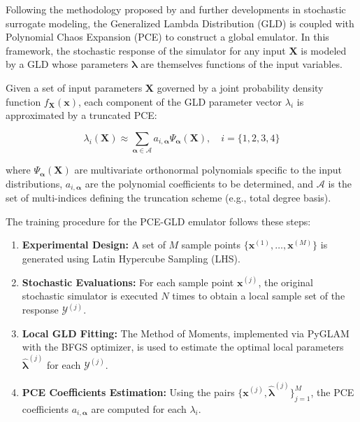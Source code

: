 Following the methodology proposed by \citet{ZhuSudret2020-GLAMoriginal} and further developments in stochastic surrogate modeling, the Generalized Lambda Distribution (GLD) is coupled with Polynomial Chaos Expansion (PCE) to construct a global emulator. In this framework, the stochastic response of the simulator for any input $\mathbf{X}$ is modeled by a GLD whose parameters $\boldsymbol{\lambda}$ are themselves functions of the input variables.

Given a set of input parameters $\mathbf{X}$ governed by a joint probability density function $f_{\mathbf{X}}(\mathbf{x})$, each component of the GLD parameter vector $\lambda_i$ is approximated by a truncated PCE:

\begin{equation}
\lambda_i(\mathbf{X}) \approx \sum_{\boldsymbol{\alpha} \in \mathcal{A}} a_{i, \boldsymbol{\alpha}} \Psi_{\boldsymbol{\alpha}}(\mathbf{X}), \quad i = \{1, 2, 3, 4\}
\label{eq:pce_lambda}
\end{equation}

where $\Psi_{\boldsymbol{\alpha}}(\mathbf{X})$ are multivariate orthonormal polynomials specific to the input distributions, $a_{i, \boldsymbol{\alpha}}$ are the polynomial coefficients to be determined, and $\mathcal{A}$ is the set of multi-indices defining the truncation scheme (e.g., total degree basis).

The training procedure for the PCE-GLD emulator follows these steps:

\begin{enumerate}
    \item \textbf{Experimental Design:} A set of $M$ sample points $\{\mathbf{x}^{(1)}, \dots, \mathbf{x}^{(M)}\}$ is generated using Latin Hypercube Sampling (LHS).
    \item \textbf{Stochastic Evaluations:} For each sample point $\mathbf{x}^{(j)}$, the original stochastic simulator is executed $N$ times to obtain a local sample set of the response $\mathcal{Y}^{(j)}$.
    \item \textbf{Local GLD Fitting:} The Method of Moments, implemented via PyGLAM with the BFGS optimizer, is used to estimate the optimal local parameters $\hat{\boldsymbol{\lambda}}^{(j)}$ for each $\mathcal{Y}^{(j)}$.
    \item \textbf{PCE Coefficients Estimation:} Using the pairs $\{\mathbf{x}^{(j)}, \hat{\boldsymbol{\lambda}}^{(j)}\}_{j=1}^M$, the PCE coefficients $a_{i, \boldsymbol{\alpha}}$ are computed for each $\lambda_i$.
\end{enumerate}

